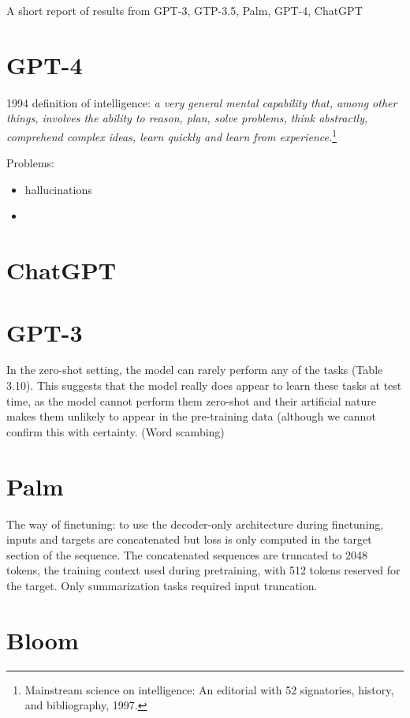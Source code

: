 A short report of results from GPT-3, GTP-3.5, Palm, GPT-4, ChatGPT


\section{GPT-4}


1994 definition of intelligence: \emph{a very general mental capability that, among other things, involves
the ability to reason, plan, solve problems, think abstractly, comprehend complex ideas, learn quickly and learn from experience.}\footnote{Mainstream science on intelligence: An editorial with 52 signatories,
history, and bibliography, 1997.}


Problems:
\begin{itemize}
    \item hallucinations
    \item
\end{itemize}





\section{ChatGPT}

\section{GPT-3}
In the zero-shot setting, the model can rarely perform any of the tasks (Table 3.10). This suggests that the model really does appear to learn these tasks at test time, as the model cannot perform them zero-shot and their artificial nature makes them unlikely to appear in the pre-training data (although we cannot confirm this with certainty. 
(Word scambing)


\section{Palm}

The way of finetuning: to use the decoder-only architecture during finetuning, inputs and targets are
concatenated but loss is only computed in the target section of the sequence. The concatenated sequences
are truncated to 2048 tokens, the training context used during pretraining, with 512 tokens reserved for the
target. Only summarization tasks required input truncation.

\section{Bloom}

